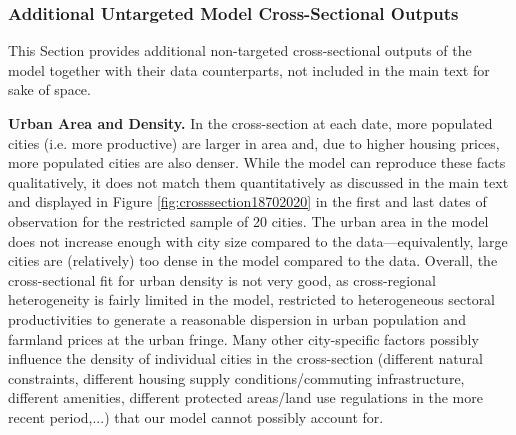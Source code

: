 \documentclass[11pt]{report}
\begin{document}
\subsubsection{Additional Untargeted Model Cross-Sectional Outputs}\label{B-sec:crossnontargeted}

This Section provides additional non-targeted cross-sectional outputs of the model together with their data counterparts, not included in the main text for sake of space.

\textbf{Urban Area and Density.} In the cross-section at each date, more populated cities (i.e. more productive) are larger in area and, due to higher housing prices, more populated cities are also denser. While the model can reproduce these facts qualitatively, it does not match them quantitatively as discussed in the main text and displayed in Figure \ref{fig:crosssection18702020} in the first and last dates of observation for the restricted sample of 20 cities. The urban area in the model does not increase enough with city size compared to the data---equivalently, large cities are (relatively) too dense in the model compared to the data. Overall, the cross-sectional fit for urban density is not very good, as cross-regional heterogeneity is fairly limited in the model, restricted to heterogeneous sectoral productivities to generate a reasonable dispersion in urban population and farmland prices at the urban fringe. Many other city-specific factors possibly influence the density of individual cities in the cross-section (different natural constraints, different housing supply conditions/commuting infrastructure, different amenities, different protected areas/land use regulations in the more recent period,...) that our model cannot possibly account for.
\end{document}
